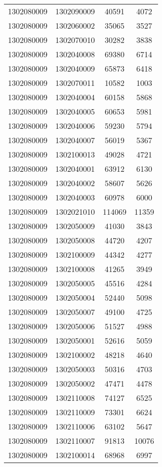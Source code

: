 \begin{longtable}[h]{llcc}
		1302080009 & 1302090009 & 40591 & 4072\\
		1302080009 & 1302060002 & 35065 & 3527\\
		1302080009 & 1302070010 & 30282 & 3838\\
		1302080009 & 1302040008 & 69380 & 6714\\
		1302080009 & 1302040009 & 65873 & 6418\\
		1302080009 & 1302070011 & 10582 & 1003\\
		1302080009 & 1302040004 & 60158 & 5868\\
		1302080009 & 1302040005 & 60653 & 5981\\
		1302080009 & 1302040006 & 59230 & 5794\\
		1302080009 & 1302040007 & 56019 & 5367\\
		1302080009 & 1302100013 & 49028 & 4721\\
		1302080009 & 1302040001 & 63912 & 6130\\
		1302080009 & 1302040002 & 58607 & 5626\\
		1302080009 & 1302040003 & 60978 & 6000\\
		1302080009 & 1302021010 & 114069 & 11359\\
		1302080009 & 1302050009 & 41030 & 3843\\
		1302080009 & 1302050008 & 44720 & 4207\\
		1302080009 & 1302100009 & 44342 & 4277\\
		1302080009 & 1302100008 & 41265 & 3949\\
		1302080009 & 1302050005 & 45516 & 4284\\
		1302080009 & 1302050004 & 52440 & 5098\\
		1302080009 & 1302050007 & 49100 & 4725\\
		1302080009 & 1302050006 & 51527 & 4988\\
		1302080009 & 1302050001 & 52616 & 5059\\
		1302080009 & 1302100002 & 48218 & 4640\\
		1302080009 & 1302050003 & 50316 & 4703\\
		1302080009 & 1302050002 & 47471 & 4478\\
		1302080009 & 1302110008 & 74127 & 6525\\
		1302080009 & 1302110009 & 73301 & 6624\\
		1302080009 & 1302110006 & 63102 & 5647\\
		1302080009 & 1302110007 & 91813 & 10076\\
		1302080009 & 1302100014 & 68968 & 6997\\

\end{longtable}

